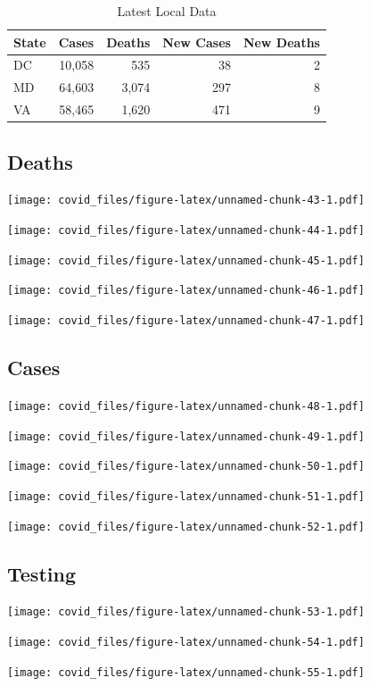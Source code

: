 \documentclass[]{article}
\begin{document}
\begin{table}[!h]

\caption{\label{tab:unnamed-chunk-42}Latest Local Data}
\centering
\begin{tabular}{l|r|r|r|r}
\hline
State & Cases & Deaths & New Cases & New Deaths\\
\hline
DC & 10,058 & 535 & 38 & 2\\
\hline
MD & 64,603 & 3,074 & 297 & 8\\
\hline
VA & 58,465 & 1,620 & 471 & 9\\
\hline
\end{tabular}
\end{table}

\newpage

\hypertarget{deaths-2}{%
\subsection{Deaths}\label{deaths-2}}

\texttt{[image: covid\_files/figure-latex/unnamed-chunk-43-1.pdf]}

\texttt{[image: covid\_files/figure-latex/unnamed-chunk-44-1.pdf]}

\texttt{[image: covid\_files/figure-latex/unnamed-chunk-45-1.pdf]}

\texttt{[image: covid\_files/figure-latex/unnamed-chunk-46-1.pdf]}

\texttt{[image: covid\_files/figure-latex/unnamed-chunk-47-1.pdf]}

\newpage

\hypertarget{cases-2}{%
\subsection{Cases}\label{cases-2}}

\texttt{[image: covid\_files/figure-latex/unnamed-chunk-48-1.pdf]}

\texttt{[image: covid\_files/figure-latex/unnamed-chunk-49-1.pdf]}

\texttt{[image: covid\_files/figure-latex/unnamed-chunk-50-1.pdf]}

\texttt{[image: covid\_files/figure-latex/unnamed-chunk-51-1.pdf]}

\texttt{[image: covid\_files/figure-latex/unnamed-chunk-52-1.pdf]}

\newpage

\hypertarget{testing-2}{%
\subsection{Testing}\label{testing-2}}

\texttt{[image: covid\_files/figure-latex/unnamed-chunk-53-1.pdf]}

\texttt{[image: covid\_files/figure-latex/unnamed-chunk-54-1.pdf]}

\texttt{[image: covid\_files/figure-latex/unnamed-chunk-55-1.pdf]}
\end{document}
